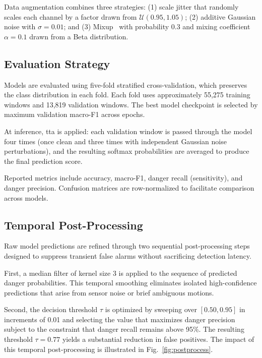 \documentclass[3p,times,procedia]{elsarticle}
\begin{document}
Data augmentation combines three strategies: (1) scale jitter that randomly scales each channel by a factor drawn from $\mathcal{U}(0.95, 1.05)$; (2) additive Gaussian noise with $\sigma = 0.01$; and (3) Mixup~\cite{zhang2018mixup} with probability 0.3 and mixing coefficient $\alpha = 0.1$ drawn from a Beta distribution.

\subsection{Evaluation Strategy}

Models are evaluated using five-fold stratified cross-validation, which preserves the class distribution in each fold. Each fold uses approximately 55,275 training windows and 13,819 validation windows. The best model checkpoint is selected by maximum validation macro-F1 across epochs.

At inference, \ac{tta} is applied: each validation window is passed through the model four times (once clean and three times with independent Gaussian noise perturbations), and the resulting softmax probabilities are averaged to produce the final prediction score.

Reported metrics include accuracy, macro-F1, danger recall (sensitivity), and danger precision. Confusion matrices are row-normalized to facilitate comparison across models.

\subsection{Temporal Post-Processing}

Raw model predictions are refined through two sequential post-processing steps designed to suppress transient false alarms without sacrificing detection latency.

First, a median filter of kernel size 3 is applied to the sequence of predicted danger probabilities. This temporal smoothing eliminates isolated high-confidence predictions that arise from sensor noise or brief ambiguous motions.

Second, the decision threshold $\tau$ is optimized by sweeping over $[0.50, 0.95]$ in increments of 0.01 and selecting the value that maximizes danger precision subject to the constraint that danger recall remains above 95\%. The resulting threshold $\tau = 0.77$ yields a substantial reduction in false positives. The impact of this temporal post-processing is illustrated in Fig.~\ref{fig:postprocess}.
\end{document}
